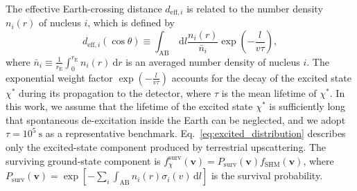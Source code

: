 \documentclass[aps,twocolumn,prl,showpacs,showkeys,preprintnumbers,superscriptaddress,nobibnotes,floatfix,nofootinbib]{revtex4-2}
\begin{document}
The effective Earth-crossing distance $d_{\mathrm{eff},i}$ is related to the number density $n_i(r)$ of nucleus $i$, which is defined by
\begin{equation}
    d_{\mathrm{eff},i}(\cos \theta) \equiv \int_{\mathrm{AB}} \mathrm{~d} l \frac{n_i(r)}{\bar{n}_i} \exp \left(-\frac{l}{v \tau}\right),
\end{equation}
where $\bar{n}_i \equiv \frac{1}{r_{\mathrm{E}}} \int_{0}^{r_{\mathrm{E}}}  n_i(r) \mathrm{~d} r$ is an averaged number density of nucleus $i$. The exponential weight factor $\exp \left(-\frac{l}{v \tau}\right)$ accounts for the decay of the excited state $\chi^*$ during its propagation to the detector, where $\tau$ is the mean lifetime of $\chi^{*}$. In this work, we assume that the lifetime of the excited state $\chi^{*}$ is sufficiently long that spontaneous de-excitation inside the Earth can be neglected, and we adopt $\tau=10^5~\mathrm{s}$ as a representative benchmark. Eq.~\ref{eq:excited_distribution} describes only the excited-state component produced by terrestrial upscattering. The surviving ground-state component is $f_{\chi}^{\mathrm{surv}}(\mathbf{v}) =P_{\mathrm{surv}}(\mathbf{v})f_{\mathrm{SHM}}(\mathbf{v})$, where $P_{\mathrm{surv}}(\mathbf{v}) =\exp[- \sum_i\int_{\mathrm{AB}}n_i(r)\sigma_i(v)\,\mathrm{d}l]$ is the survival probability.
\end{document}
